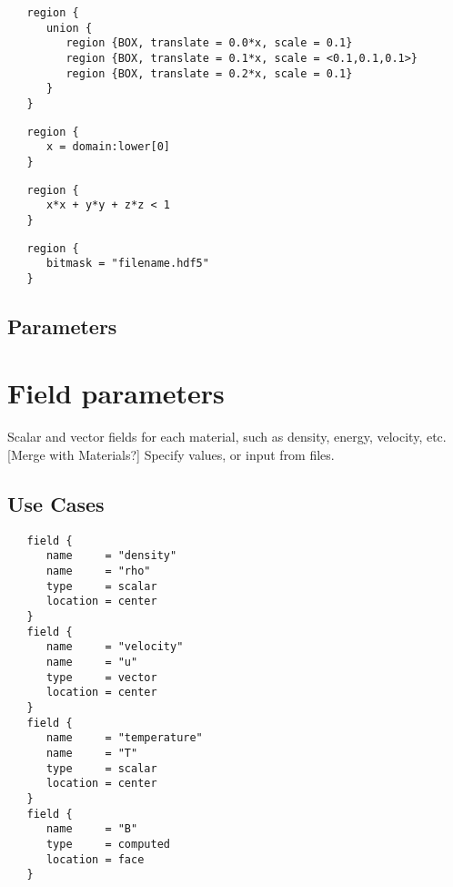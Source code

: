 \documentclass{book}
\begin{document}
\begin{verbatim}
   region {
      union {
         region {BOX, translate = 0.0*x, scale = 0.1}
         region {BOX, translate = 0.1*x, scale = <0.1,0.1,0.1>}
         region {BOX, translate = 0.2*x, scale = 0.1}
      }
   }
\end{verbatim}

\begin{verbatim}
   region {
      x = domain:lower[0]
   }
\end{verbatim}

\begin{verbatim}
   region {
      x*x + y*y + z*z < 1
   }
\end{verbatim}

\begin{verbatim}
   region {
      bitmask = "filename.hdf5"
   }
\end{verbatim}


\subsection{Parameters}

\section{Field parameters} \label{s:field}

Scalar and vector fields for each material, such as
 density, energy, velocity, etc.  [Merge with Materials?]  Specify
 values, or input from files.

\subsection{Use Cases}
\begin{verbatim}
   field {
      name     = "density"
      name     = "rho"
      type     = scalar
      location = center
   }
   field {
      name     = "velocity"
      name     = "u"
      type     = vector
      location = center
   }
   field {
      name     = "temperature"
      name     = "T"
      type     = scalar
      location = center
   }
   field {
      name     = "B"
      type     = computed
      location = face
   }
\end{verbatim}
\end{document}
